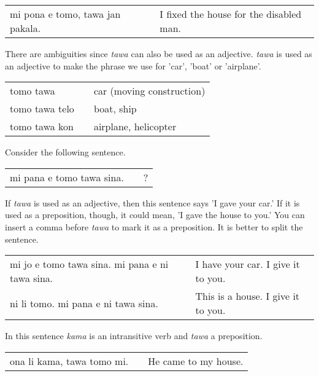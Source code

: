 \begin{supertabular}{p{5,5cm}|ll}
mi pona e tomo, tawa jan pakala. && I fixed the house for the disabled man. \\
\end{supertabular} 

% 
There are ambiguities since \textit{tawa} can also be used as an adjective. 
\textit{tawa} is used as an adjective to make the phrase we use for 'car', 'boat' or 'airplane'.

\begin{supertabular}{p{5,5cm}|ll}
tomo tawa && car (moving construction) \\
tomo tawa telo && boat, ship \\
tomo tawa kon && airplane, helicopter \\
\end{supertabular} 
%

Consider the following sentence.

\begin{supertabular}{p{5,5cm}|ll}
mi pana e tomo tawa sina. && ? \\   %
\end{supertabular} 

If \textit{tawa} is used as an adjective, then this sentence says 'I gave your car.' 
If it is used as a preposition, though, it could mean, 'I gave the house to you.' 
You can insert a comma before \textit{tawa} to mark it as a preposition. 
It is better to split the sentence. 

\begin{supertabular}{p{5,5cm}|ll}
mi jo e tomo tawa sina. mi pana e ni tawa sina. && I have your car. I give it to you. \\
ni li tomo. mi pana e ni tawa sina. && This is a house. I give it to you. \\
\end{supertabular} 

%
%
In this sentence \textit{kama} is an intransitive verb and \textit{tawa} a preposition.

\begin{supertabular}{p{5,5cm}|ll}
ona li kama, tawa tomo mi. && He came to my house. \\
\end{supertabular} 























